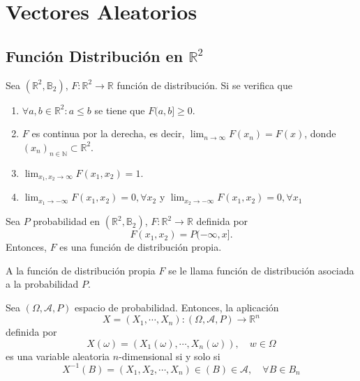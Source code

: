 \chapter{Vectores Aleatorios}

\section{Función Distribución en $\mathbb{R}^{2}$}

\begin{defn}
  Sea $ (\mathbb{R}^{2}, \mathbb{B}_{2}) $, $F : \mathbb{R}^{2} \to \mathbb{R}$ función de distribución. Si se verifica que
  \begin{enumerate}[label=(\roman*)]
    \item $\forall a, b \in \mathbb{R}^{2} : a \leq b$ se tiene que $F(a, b] \geq 0$.
    \item $F$ es continua por la derecha, es decir, $\lim_{n \to \infty} F(x_{n}) = F(x)$, donde $( x_{n} )_{n \in \mathbb{N}} \subset \mathbb{R}^{2}$.
    \item $\lim_{x_{1}, x_{2} \rightarrow \infty} F(x_{1}, x_{2}) = 1$.
    \item $\lim_{x_{1} \rightarrow - \infty} F(x_{1}, x_{2}) = 0, \forall x_{2}$ y $\lim_{x_{2} \rightarrow - \infty} F(x_{1}, x_{2}) = 0, \forall x_{1}$
  \end{enumerate}
\end{defn}

\begin{theo}
  Sea $P$ probabilidad en $ (\mathbb{R}^{2}, \mathbb{B}_{2}) $, $F : \mathbb{R}^{2} \to \mathbb{R}$ definida por
  \[ 
    F(x_{1}, x_{2}) = P(-\infty, x].
  \] 
  Entonces, $F$ es una función de distribución propia.
\end{theo}

\begin{obs}
  A la función de distribución propia $F$ se le llama función de distribución asociada a la probabilidad $P$.
\end{obs}

\begin{defn}
  Sea $(\Omega, \mathcal{A}, P )$ espacio de probabilidad. Entonces, la aplicación
  \[ 
    X = (X_{1}, \cdots, X_{n}) : (\Omega, \mathcal{A}, P ) \to \mathbb{R}^{n}
  \] 
  definida por
  \[ 
    X(\omega) = (X_{1}(\omega), \cdots, X_{n}(\omega)), \quad w \in \Omega
  \] 
  es una variable aleatoria $n$-dimensional si y solo si
  \[ 
    X^{-1}(B) = (X_{1}, X_{2}, \cdots, X_{n})\in(B) \in \mathcal{A}, \quad \forall B \in B_{n} 
  \] 
\end{defn}

